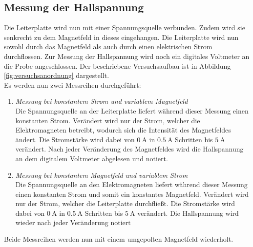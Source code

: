 \subsection{Messung der Hallspannung}
Die Leiterplatte wird nun mit einer Spannungsquelle verbunden. Zudem wird sie 
senkrecht zu dem Magnetfeld in dieses eingehangen. Die Leiterplatte wird nun sowohl durch das Magnetfeld
als auch durch einen elektrischen Strom durchflossen. Zur Messung der Hallspannung wird noch ein 
digitales Voltmeter an die Probe angeschlossen. Der beschriebene Versuchsaufbau ist in Abbildung
\ref{fig:versuchsanordnung} dargestellt.\\
Es werden nun zwei Messreihen durchgeführt:
\begin{enumerate}
    \item \textit{Messung bei konstantem Strom und variablem Magnetfeld}\\
        Die Spannungsquelle an der Leiterplatte liefert während dieser Messung einen konstanten Strom. 
        Verändert wird nur der Strom, welcher die Elektromagneten betreibt, wodurch sich die Intensität
        des Magnetfeldes ändert. Die Stromstärke wird dabei von $\SI{0}{\ampere}$ in $\SI{0.5}{\ampere}$
        Schritten bis $\SI{5}{\ampere}$ verändert. Nach jeder Veränderung des Magnetfeldes wird die 
        Hallspannung an dem digitalem Voltmeter abgelesen und notiert.\\
    \item \textit{Messung bei konstantem Magnetfeld und variablem Strom}\\
        Die Spannungsquelle an den Elektromagneten liefert während dieser Messung einen konstanten Strom und 
        somit ein konstantes Magnetfeld. 
        Verändert wird nur der Strom, welcher die Leiterplatte durchfließt.
        Die Stromstärke wird dabei von $\SI{0}{\ampere}$ in $\SI{0.5}{\ampere}$
        Schritten bis $\SI{5}{\ampere}$ verändert. Die Hallspannung wird wieder nach jeder Veränderung
        notiert\\
\end{enumerate}
Beide Messreihen werden nun mit einem umgepolten Magnetfeld wiederholt.